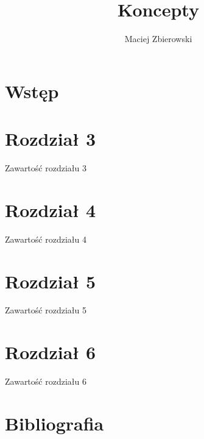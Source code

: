 \documentclass[11pt, a4paper]{article}
\author{Maciej Zbierowski}
\title{Koncepty}
\begin{document}
	\maketitle
	\tableofcontents
	\newpage
	
	\section*{Wstęp}

	

	
	
	
	\newpage
	
	
	
	\newpage
	
	\section{Rozdział 3}
	Zawartość rozdziału 3
	
	\newpage
	
	\section{Rozdział 4}
	Zawartość rozdziału 4
	
	\newpage

	\section{Rozdział 5}
	Zawartość rozdziału 5
	
	\newpage
	
	\section{Rozdział 6}
	Zawartość rozdziału 6
	
	\newpage
	
	\section{Bibliografia}
	\begin{thebibliography}{2}
	
	\end{thebibliography}
\end{document}
